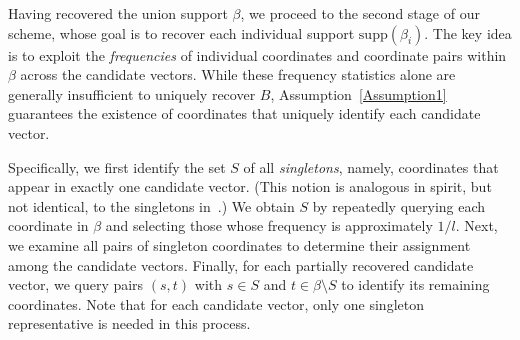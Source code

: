 \documentclass[10pt,a4paper]{amsart}
\newcommand{\xl}[1]{{\color{blue}#1}}
\newcommand{\supp}{\mathrm{supp}}
\begin{document}

Having recovered the union support $\beta$, we proceed to the second stage of our scheme, whose goal is to recover each individual support $\supp(\beta_i)$. The key idea is to exploit the \emph{frequencies} of individual coordinates and coordinate pairs within $\beta$ across the candidate vectors. While these frequency statistics alone are generally insufficient to uniquely recover $B$, Assumption~\ref{Assumption1} guarantees the existence of coordinates that uniquely identify each candidate vector. 

Specifically, we first identify the set $S$ of all \emph{singletons}, namely, coordinates that appear in exactly one candidate vector. (This notion is analogous in spirit, but not identical, to the singletons in~\cite{li2025support}.) We obtain $S$ by repeatedly querying each coordinate in $\beta$ and selecting those whose frequency is approximately $1/l$. Next, we examine all pairs of singleton coordinates to determine their assignment among the candidate vectors. Finally, for each partially recovered candidate vector, we query pairs $(s,t)$ with $s\in S$ and $t\in\beta\setminus S$ to identify its remaining coordinates. Note that for each candidate vector, only one singleton representative is needed in this process. 
\end{document}

